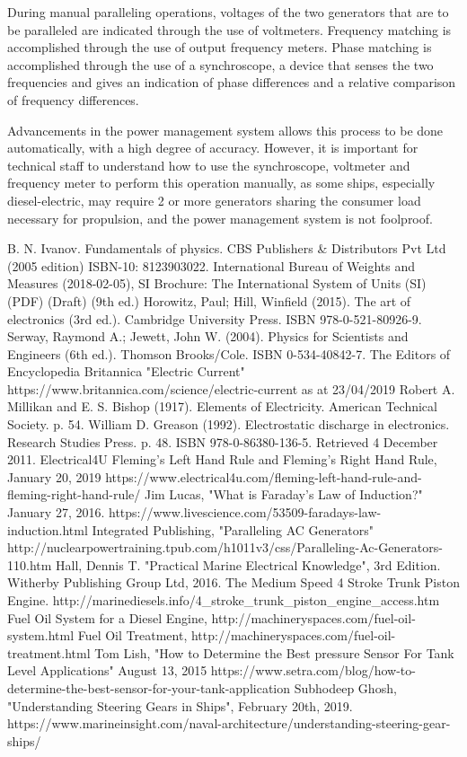 \documentclass[11pt,a4paper]{article}
\begin{document}
During manual  paralleling  operations,  voltages  of  the  two  generators  that  are  to  be  paralleled  are indicated through the use of voltmeters.   Frequency matching is accomplished through the use of output frequency meters.  Phase matching is accomplished through the use of a synchroscope, a  device  that  senses  the  two  frequencies  and  gives  an  indication  of  phase  differences  and  a relative comparison of frequency differences.

Advancements in the power management system allows this process to be done automatically, with a high degree of accuracy. However, it is important for technical staff to understand how to use the synchroscope, voltmeter and frequency meter to perform this operation manually, as some ships, especially diesel-electric, may require 2 or more generators sharing the consumer load necessary for propulsion, and the power management system is not foolproof.
\newpage
\begin{thebibliography}{9}
B. N. Ivanov. Fundamentals of physics. CBS Publishers \& Distributors Pvt Ltd (2005 edition) ISBN-10: 8123903022.
International Bureau of Weights and Measures (2018-02-05), SI Brochure: The International System of Units (SI) (PDF) (Draft) (9th ed.)
Horowitz, Paul; Hill, Winfield (2015). The art of electronics (3rd ed.). Cambridge University Press. ISBN 978-0-521-80926-9.
Serway, Raymond A.; Jewett, John W. (2004). Physics for Scientists and Engineers (6th ed.). Thomson Brooks/Cole. ISBN 0-534-40842-7.
The Editors of Encyclopedia Britannica "Electric Current" https://www.britannica.com/science/electric-current as at 23/04/2019
Robert A. Millikan and E. S. Bishop (1917). Elements of Electricity. American Technical Society. p. 54.
William D. Greason (1992). Electrostatic discharge in electronics. Research Studies Press. p. 48. ISBN 978-0-86380-136-5. Retrieved 4 December 2011.
Electrical4U Fleming's Left Hand Rule and Fleming's Right Hand Rule, January 20, 2019 https://www.electrical4u.com/fleming-left-hand-rule-and-fleming-right-hand-rule/
Jim Lucas, "What is Faraday's Law of Induction?" January 27, 2016. https://www.livescience.com/53509-faradays-law-induction.html
Integrated Publishing, "Paralleling AC Generators" http://nuclearpowertraining.tpub.com/h1011v3/css/Paralleling-Ac-Generators-110.htm
Hall, Dennis T. "Practical Marine Electrical Knowledge", 3rd Edition. Witherby Publishing Group Ltd, 2016.
The Medium Speed 4 Stroke Trunk Piston Engine. http://marinediesels.info/4\_stroke\_trunk\_piston\_engine\_access.htm
Fuel Oil System for a Diesel Engine, http://machineryspaces.com/fuel-oil-system.html
Fuel Oil Treatment, http://machineryspaces.com/fuel-oil-treatment.html
Tom Lish, "How to Determine the Best pressure Sensor For Tank Level Applications" August 13, 2015 https://www.setra.com/blog/how-to-determine-the-best-sensor-for-your-tank-application
Subhodeep Ghosh, "Understanding Steering Gears in Ships", February 20th, 2019. https://www.marineinsight.com/naval-architecture/understanding-steering-gear-ships/
\end{thebibliography}
\end{document}
